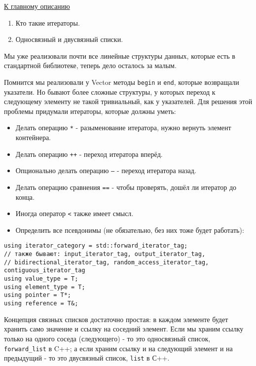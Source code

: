 \label{md2tex6}
\hyperref[md2texREADME]{К главному описанию}


\begin{enumerate}
    \item Кто такие итераторы.
    \item Односвязный и двусвязный списки.
\end{enumerate}


Мы уже реализовали почти все линейные структуры данных, которые есть в стандартной библиотеке, теперь дело осталось за малым.


Помнится мы реализовали у Vector методы \texttt{begin} и \texttt{end}, которые возвращали указатели. Но бывают более сложные структуры, у которых переход к следующему элементу не такой тривиальный, как у указателей. Для решения этой проблемы придумали итераторы, которые должны уметь:
\begin{itemize}
    \item Делать операцию \texttt{*} - разыменование итератора, нужно вернуть элемент контейнера.
    \item Делать операцию \texttt{++} - переход итератора вперёд.
    \item Опционально делать операцию \texttt{--} - переход итератора назад.
    \item Делать операцию сравнения \texttt{==} - чтобы проверять, дошёл ли итератор до конца.
    \item Иногда оператор \texttt{<} также имеет смысл.
    \item Определить все псевдонимы (не обязательно, без них тоже будет работать):
\end{itemize}
\begin{verbatim}
using iterator_category = std::forward_iterator_tag;
// также бывают: input_iterator_tag, output_iterator_tag,
// bidirectional_iterator_tag, random_access_iterator_tag, contiguous_iterator_tag
using value_type = T;
using element_type = T;
using pointer = T*;
using reference = T&;
\end{verbatim}



Концепция связных списков достаточно простая: в каждом элементе будет хранить само значение и ссылку на соседний элемент. Если мы храним ссылку только на одного соседа (следующего) - то это односвязный список, \texttt{forward_list} в C++; а если храним ссылку и на следующий элемент и на предыдущий - то это двусвязный список, \texttt{list} в С++.

